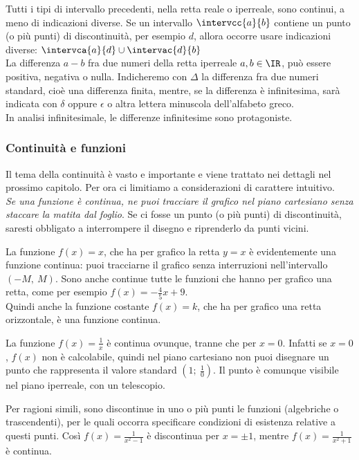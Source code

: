Tutti i tipi di intervallo precedenti, nella retta reale o iperreale, sono
continui, a meno di indicazioni diverse. Se un intervallo $\intervcc{a}{b}$ contiene un punto
(o più punti) di discontinuità, per esempio $d$, allora occorre usare indicazioni
diverse: $\intervca{a}{d}\cup\intervac{d}{b}$\\ 
La differenza $a-b$ fra due numeri della retta iperreale $a, b \in \IR$, 
può essere positiva, negativa o nulla. Indicheremo con $\Delta$ la 
differenza fra due numeri standard, cioè una differenza finita, mentre, se la 
differenza è infinitesima, sarà indicata con $\delta$ oppure $\epsilon$
o altra lettera minuscola dell'alfabeto greco.\\
In analisi infinitesimale, le differenze infinitesime sono protagoniste.

\subsubsection{Continuità e funzioni}
\label{04_diffcontfunzioni}
Il tema della continuità è vasto e importante e viene trattato nei dettagli
nel prossimo capitolo. Per ora ci limitiamo a considerazioni di carattere intuitivo.\\
\emph{Se una funzione è continua, ne puoi tracciare il grafico nel piano cartesiano 
senza staccare la matita dal foglio}. Se ci fosse un punto (o più punti)
di discontinuità, saresti obbligato a interrompere il disegno e riprenderlo
da punti vicini.
\begin{esempio}
 La funzione $f(x)=x$, che ha per grafico la retta $y=x$ è evidentemente 
 una funzione continua: puoi tracciarne il grafico senza interruzioni
 nell'intervallo $(-M,\ M)$. Sono anche continue tutte le funzioni che hanno
 per grafico una retta, come per esempio $f(x)=-\frac{4}{5}x+9$.\\
 Quindi anche la funzione costante $f(x)=k$, che ha per grafico una retta
 orizzontale, è una funzione continua.
\end{esempio}
\begin{esempio}
 La funzione $f(x)=\frac{1}{x}$ è continua ovunque, tranne che per $x=0$.
 Infatti se $x=0$, $f(x)$ non è calcolabile, quindi nel piano cartesiano 
 non puoi disegnare un punto  che rappresenta il valore standard 
 $(1;\ \frac{1}{0})$. Il punto è comunque visibile nel piano iperreale, con un
 telescopio.
 \end{esempio}
\begin{esempio}
 Per ragioni simili, sono discontinue in uno o più punti le funzioni
 (algebriche o trascendenti), per le quali occorra specificare condizioni 
 di esistenza relative a questi punti.
 Così $f(x)=\frac{1}{x^2-1}$ è discontinua per $x=\pm 1$, mentre 
 $f(x)=\frac{1}{x^2+1}$ è continua.
\end{esempio}

